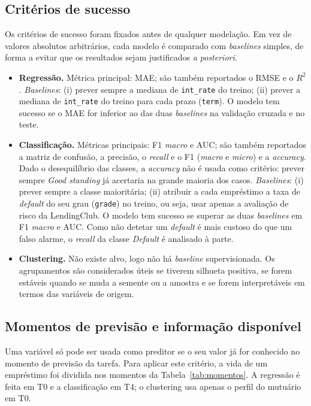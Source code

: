 \subsection{Critérios de sucesso}
\label{sec:sucesso}

Os critérios de sucesso foram fixados antes de qualquer modelação. Em vez de valores absolutos arbitrários, cada modelo é comparado com \textit{baselines} simples, de forma a evitar que os resultados sejam justificados \textit{a posteriori}.

\begin{itemize}
  \item \textbf{Regressão.} Métrica principal: MAE; são também reportados o RMSE e o $R^2$. \textit{Baselines}: (i) prever sempre a mediana de \texttt{int\_rate} do treino; (ii) prever a mediana de \texttt{int\_rate} do treino para cada prazo (\texttt{term}). O modelo tem sucesso se o MAE for inferior ao das duas \textit{baselines} na validação cruzada e no teste.
  \item \textbf{Classificação.} Métricas principais: F1 \textit{macro} e AUC; são também reportados a matriz de confusão, a precisão, o \textit{recall} e o F1 (\textit{macro} e \textit{micro}) e a \textit{accuracy}. Dado o desequilíbrio das classes, a \textit{accuracy} não é usada como critério: prever sempre \textit{Good standing} já acertaria na grande maioria dos casos. \textit{Baselines}: (i) prever sempre a classe maioritária; (ii) atribuir a cada empréstimo a taxa de \textit{default} do seu grau (\texttt{grade}) no treino, ou seja, usar apenas a avaliação de risco da LendingClub. O modelo tem sucesso se superar as duas \textit{baselines} em F1 \textit{macro} e AUC. Como não detetar um \textit{default} é mais custoso do que um falso alarme, o \textit{recall} da classe \textit{Default} é analisado à parte.
  \item \textbf{Clustering.} Não existe alvo, logo não há \textit{baseline} supervisionada. Os agrupamentos são considerados úteis se tiverem silhueta positiva, se forem estáveis quando se muda a semente ou a amostra e se forem interpretáveis em termos das variáveis de origem.
\end{itemize}


\subsection{Momentos de previsão e informação disponível}

Uma variável só pode ser usada como preditor se o seu valor já for conhecido no momento de previsão da tarefa. Para aplicar este critério, a vida de um empréstimo foi dividida nos momentos da Tabela~\ref{tab:momentos}. A regressão é feita em T0 e a classificação em T4; o clustering usa apenas o perfil do mutuário em T0.


